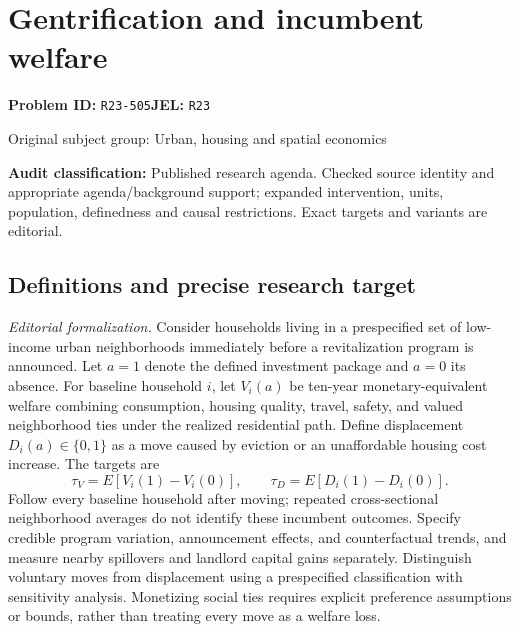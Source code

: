 \documentclass[11pt,a4paper]{article}
\begin{document}
\section*{Gentrification and incumbent welfare}
\textbf{Problem ID:} \texttt{R23-505}\quad \textbf{JEL:} \texttt{R23}\par
\label{problem:OP-0465}
{\sffamily\small\color{muted}Original subject group: Urban, housing and spatial economics\par}
\label{definitions:problem:30007747}
\textbf{Audit classification:} Published research agenda. Checked source identity and appropriate agenda/background support; expanded intervention, units, population, definedness and causal restrictions. Exact targets and variants are editorial.
\subsection*{Definitions and precise research target}
\textit{Editorial formalization.} Consider households living in a prespecified set of low-income urban neighborhoods immediately before a revitalization program is announced. Let \(a=1\) denote the defined investment package and \(a=0\) its absence. For baseline household \(i\), let \(V_i(a)\) be ten-year monetary-equivalent welfare combining consumption, housing quality, travel, safety, and valued neighborhood ties under the realized residential path. Define displacement \(D_i(a)\in\{0,1\}\) as a move caused by eviction or an unaffordable housing cost increase. The targets are
\[\tau_V=E[V_i(1)-V_i(0)],\qquad\tau_D=E[D_i(1)-D_i(0)].\]
Follow every baseline household after moving; repeated cross-sectional neighborhood averages do not identify these incumbent outcomes. Specify credible program variation, announcement effects, and counterfactual trends, and measure nearby spillovers and landlord capital gains separately. Distinguish voluntary moves from displacement using a prespecified classification with sensitivity analysis. Monetizing social ties requires explicit preference assumptions or bounds, rather than treating every move as a welfare loss.
\end{document}

